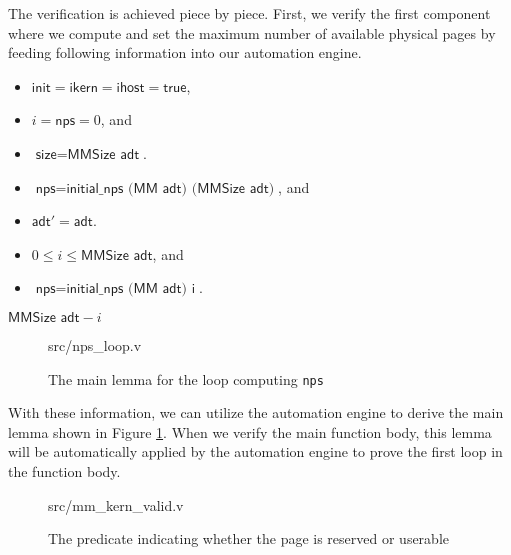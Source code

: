 The verification is achieved piece by piece. First, we verify the first component where
we compute and set the maximum number of available physical pages by feeding
following information into our automation engine.

\begin{definition} 
\begin{itemize}
\item $\textsf{init} = \textsf{ikern} = \textsf{ihost} = \textsf{true}$,
\item $i=\textsf{nps}=0$, and
\item $\textsf{size}=\textsf{MMSize adt}$.
\end{itemize}
\end{definition}

\begin{definition} 
\begin{itemize}
\item $\textsf{nps}=\textsf{initial\_nps (MM adt) (MMSize adt)}$, and 
\item $\textsf{adt}'=\textsf{adt}$.
\end{itemize}
\end{definition}

\begin{definition}
\begin{itemize}
\item $0\le i \le \textsf{MMSize adt}$, and
\item $\textsf{nps}=\textsf{initial\_nps (MM adt) i}$.
\end{itemize}
\end{definition}

\begin{definition}
$\textsf{MMSize adt}-i$
\end{definition}

\begin{figure}
	 {src/nps_loop.v}
	\caption{The main lemma for the loop computing \texttt{nps}}
	\label{fig:nps_loop_v}
\end{figure}

With these information, we can utilize the automation engine to derive the main lemma shown in Figure \ref{fig:nps_loop_v}.
When we verify the main function body, this lemma will be automatically applied by the automation engine to prove
the first loop in the function body.

\begin{figure}
	 {src/mm_kern_valid.v}
	\caption{The predicate indicating whether the page is reserved or userable}
	\label{fig:mm_kern_valid_v}
\end{figure}

